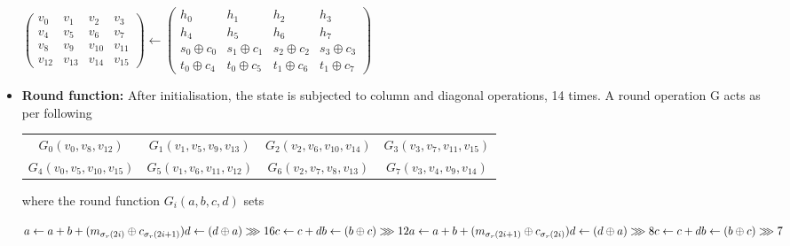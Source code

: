 \begin{itemize}
    \begin{center}
    $\begin{pmatrix} v_{0} & v_{1} & v_{2} & v_{3} \\ v_{4} & v_{5} & v_{6} & v_{7} \\
                     v_{8} & v_{9} & v_{10} & v_{11} \\ v_{12} & v_{13} & v_{14} & v_{15}\end{pmatrix} 
    \gets
    \begin{pmatrix} h_{0} & h_{1} & h_{2} & h_{3} \\ h_{4} & h_{5} & h_{6} & h_{7} \\
       s_{0} \oplus c_{0} & s_{1} \oplus c_{1} & s_{2} \oplus c_{2} & s_{3} \oplus c_{3} \\ 
       t_{0} \oplus c_{4} & t_{0} \oplus c_{5} & t_{1} \oplus c_{6} & t_{1} \oplus c_{7} \end{pmatrix}$
    \end{center}

    \item {\bf Round function:} After initialisation, the state is subjected to column and diagonal operations, 14
    times. A round operation G acts as per following

    \begin{table}[h]
      \begin{center}
        \begin{tabular}{ *{4}{c}}
        $ G_{0}(v_{0}, v_{8}, v_{12})$ & $G_{1}(v_{1}, v_{5}, v_{9}, v_{13})$ & $G_{2}(v_{2}, v_{6}, v_{10}, v_{14})$ & $G_{3}(v_{3}, v_{7}, v_{11}, v_{15}) $\\
 $G_{4}(v_{0}, v_{5}, v_{10}, v_{15})$ & $G_{5}(v_{1}, v_{6}, v_{11}, v_{12})$ & $G_{6}(v_{2}, v_{7}, v_{8}, v_{13})$ & $G_{7}(v_{3}, v_{4}, v_{9}, v_{14})$
        \end{tabular}
      \end{center}
    \end{table}


    where the round function $G_{i}(a, b, c, d)$ sets
    
    $
    a \gets a + b + (m_{\sigma_{r}(2i)} \oplus c_{\sigma_{r}(2i + 1)}) \\
    d \gets (d \oplus a) \ggg 16 \\
    c \gets c + d \\
    b \gets (b \oplus c) \ggg 12 \\
    a \gets a + b + (m_{\sigma_{r}(2i + 1)} \oplus c_{\sigma_{r}(2i)}) \\
    d \gets (d \oplus a) \ggg 8 \\
    c \gets c + d \\
    b \gets (b \oplus c) \ggg 7
    $


\end{itemize}
